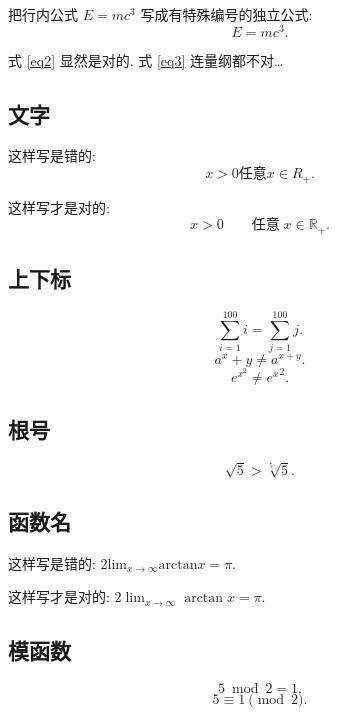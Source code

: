 \documentclass{ctexart}
\begin{document}
    把行内公式 $E=mc^3$ 写成有特殊编号的独立公式:
    \begin{equation}
        E=mc^3. \tag{$\ast$} \label{eq3}
    \end{equation}

    式 \eqref{eq2} 显然是对的. 式 \eqref{eq3} 连量纲都不对\dots
    \subsection{文字}
    这样写是错的:
    \begin{equation*}
        x > 0    任意 x \in R_+.
    \end{equation*}

    这样写才是对的:
    \begin{equation*}
        x > 0 \qquad \text{任意} \; x \in \mathbb{R_+}.
    \end{equation*}
    \subsection{上下标}
    \begin{equation*}
        \sum_{i=1}^{100} i = \sum^{100}_{j=1} j.
    \end{equation*}
    \begin{equation*}
        a^x+y \neq a^{x+y}.
    \end{equation*}
    \begin{equation*}
        e^{x^2} \neq {e^x}^2.
    \end{equation*}
    \subsection{根号}
    \begin{equation*}
        \sqrt{5} > \sqrt[5]{5}.
    \end{equation*}
    \subsection{函数名}
    这样写是错的:
    $ 2 \text{lim}_{x \rightarrow \infty} \text{arctan} x = \pi $.

    这样写才是对的:
    $ 2 \lim_{x \rightarrow \infty} \arctan x = \pi $.
    \subsection{模函数}
    \begin{equation*}
        5 \bmod 2 = 1.
    \end{equation*}
    \begin{equation*}
        5 \equiv 1 \pmod{2}.
    \end{equation*}
\end{document}
